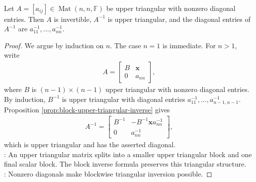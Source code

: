 \begin{theorem} \label{thm:inverse-upper-triangular} \\
Let $A=[a_{ij}]\in\operatorname{Mat}(n,n,\mathbb{F})$ be upper triangular with nonzero diagonal entries. Then $A$ is invertible, $A^{-1}$ is upper triangular, and the diagonal entries of $A^{-1}$ are $a_{11}^{-1},\ldots,a_{nn}^{-1}$.
\begin{proof}
We argue by induction on $n$. The case $n=1$ is immediate. For $n>1$, write
\begin{align}
A=
\begin{bmatrix}
B & \mathbf{x}\\
0 & a_{nn}
\end{bmatrix},
\nonumber
\end{align}
where $B$ is $(n-1)\times(n-1)$ upper triangular with nonzero diagonal entries. By induction, $B^{-1}$ is upper triangular with diagonal entries $a_{11}^{-1},\ldots,a_{n-1,n-1}^{-1}$. Proposition \ref{prop:block-upper-triangular-inverse} gives
\begin{align}
A^{-1}=
\begin{bmatrix}
B^{-1} & -B^{-1}\mathbf{x}a_{nn}^{-1}\\
0 & a_{nn}^{-1}
\end{bmatrix},
\nonumber
\end{align}
which is upper triangular and has the asserted diagonal.\\
: An upper triangular matrix splits into a smaller upper triangular block and one final scalar block. The block inverse formula preserves this triangular structure.\\
: Nonzero diagonals make blockwise triangular inversion possible.
\end{proof}
\end{theorem}

